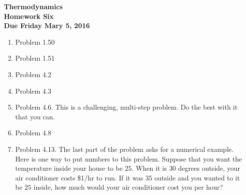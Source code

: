 \documentclass[12pt]{article}
\begin{document}
\pagestyle{empty}
 
\begin{center}
{\large {\bf Thermodynamics}}\\
\medskip
{\large {\bf Homework Six}}\\
\medskip
{ {\bf Due Friday Mary 5, 2016}}\\
\end{center}


\begin{enumerate}
  \item Problem 1.50
  \item Problem 1.51
  \item Problem 4.2
  \item Problem 4.3
  \item Problem 4.6.  This is a challenging, multi-step problem.  Do
    the best with it that you can.  
  \item Problem 4.8
  \item Problem 4.13.  The last part of the problem asks for a
    numerical example.  Here is one way to put numbers to this
    problem.  Suppose that you want the temperature inside your house
    to be $25$.  When it is $30$ degrees outside, your air conditioner
    costs \$1/hr to run.  If it was $35$ outside and you wanted to it
    be $25$ inside, how much would your air conditioner cost you per hour?
\end{enumerate}
\end{document}
